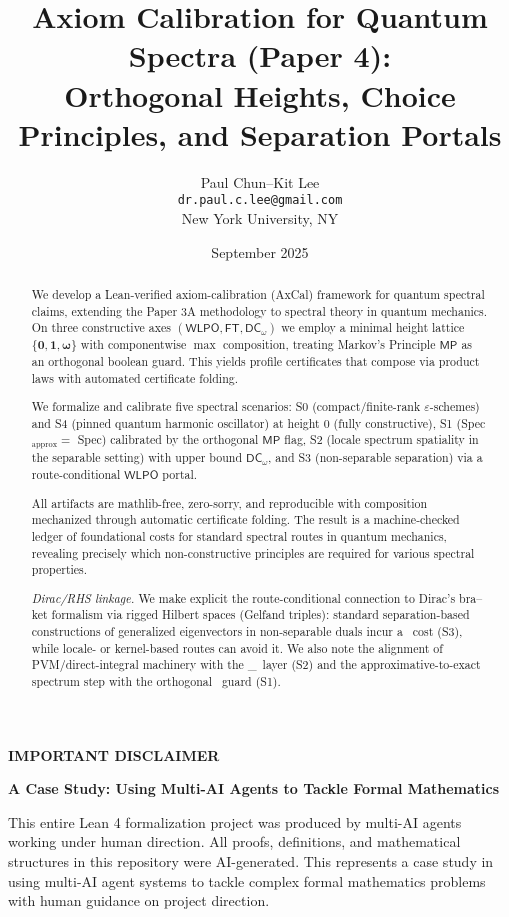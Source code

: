 \documentclass[11pt]{article}
\title{Axiom Calibration for Quantum Spectra (Paper 4):\\
Orthogonal Heights, Choice Principles, and Separation Portals}
\author{Paul Chun--Kit Lee\\
\texttt{dr.paul.c.lee@gmail.com}\\
New York University, NY}
\date{September 2025}
\newcommand{\WLPO}{\mathsf{WLPO}}
\newcommand{\FT}{\mathsf{FT}}
\newcommand{\DCw}{\mathsf{DC}_{\omega}}
\newcommand{\MP}{\mathsf{MP}}
\newcommand{\hzero}{\mathbf{0}}
\newcommand{\hone}{\mathbf{1}}
\newcommand{\homega}{\boldsymbol{\omega}}
\theoremstyle{plain}
\theoremstyle{definition}
\theoremstyle{remark}
\begin{document}
\maketitle

\begin{abstract}
We develop a Lean-verified axiom-calibration (AxCal) framework for quantum spectral claims, extending the Paper 3A methodology to spectral theory in quantum mechanics.
On three constructive axes \((\WLPO,\FT,\DCw)\) we employ a minimal height lattice
\(\{\hzero,\hone,\homega\}\) with componentwise \(\max\) composition, treating Markov's Principle \(\MP\) as an
orthogonal boolean guard. This yields profile certificates that compose via product
laws with automated certificate folding. 

We formalize and calibrate five spectral scenarios:
S0 (compact/finite-rank \(\varepsilon\)-schemes) and S4 (pinned quantum harmonic oscillator) at height \(0\) (fully constructive),
S1 (Spec\(_{\mathrm{approx}}=\) Spec) calibrated by the orthogonal \(\MP\) flag, 
S2 (locale spectrum spatiality in the separable setting) with upper bound \(\DCw\), 
and S3 (non-separable separation) via a route-conditional \(\WLPO\) portal. 

All artifacts are mathlib-free, zero-sorry, and reproducible with composition mechanized through automatic certificate folding. The result
is a machine-checked ledger of foundational costs for standard spectral routes in quantum mechanics,
revealing precisely which non-constructive principles are required for various spectral properties.

\medskip
\noindent\emph{Dirac/RHS linkage.} We make explicit the route-conditional connection to Dirac's bra--ket formalism via rigged Hilbert spaces (Gelfand triples): standard separation-based constructions of generalized eigenvectors in non-separable duals incur a \WLPO\ cost (S3), while locale- or kernel-based routes can avoid it. We also note the alignment of PVM/direct-integral machinery with the \DCw\ layer (S2) and the approximative-to-exact spectrum step with the orthogonal \MP\ guard (S1).
\end{abstract}

\begin{mdframed}[backgroundcolor=gray!10, linewidth=0pt]
\textbf{IMPORTANT DISCLAIMER}

\textbf{A Case Study: Using Multi-AI Agents to Tackle Formal Mathematics}

This entire Lean 4 formalization project was produced by multi-AI agents working under human direction. All proofs, definitions, and mathematical structures in this repository were AI-generated. This represents a case study in using multi-AI agent systems to tackle complex formal mathematics problems with human guidance on project direction.
\end{mdframed}
\end{document}
